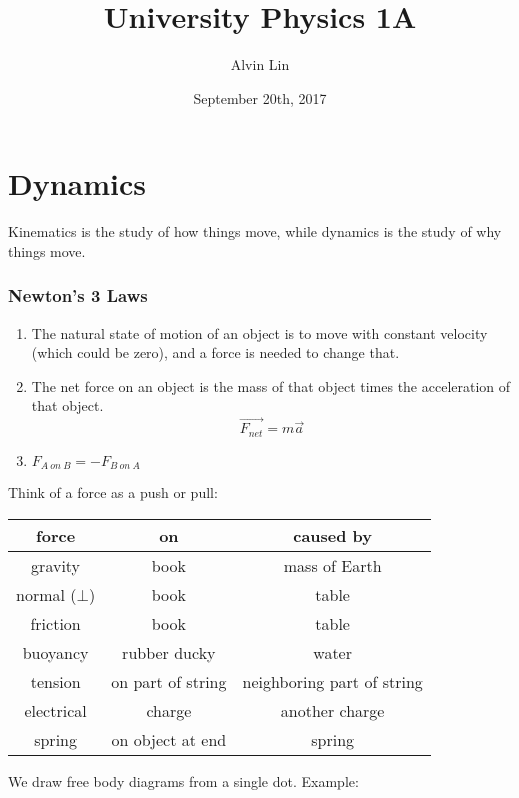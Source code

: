 \documentclass[letterpaper, 12pt]{math}
\title{University Physics 1A}
\author{Alvin Lin}
\date{September 20th, 2017}
\begin{document}
\maketitle

\section*{Dynamics}
Kinematics is the study of how things move, while dynamics is the study of why
things move.

\subsubsection*{Newton's 3 Laws}
\begin{enumerate}
  \item The natural state of motion of an object is to move with
    constant velocity (which could be zero), and a force is needed to
    change that.
  \item The net force on an object is the mass of that object times the
    acceleration of that object.
    \[ \overrightarrow{F_{net}} = m\vec{a} \]
  \item \( F_{A\ on\ B} = -F_{B\ on\ A} \)
\end{enumerate}
Think of a force as a push or pull:
\begin{center}
  \begin{tabular}{|c|c|c|}
    \hline
    \textbf{force} & \textbf{on} & \textbf{caused by} \\ \hline
    gravity & book & mass of Earth \\ \hline
    normal (\( \bot \)) & book & table \\ \hline
    friction & book & table \\ \hline
    buoyancy & rubber ducky & water \\ \hline
    tension & on part of string & neighboring part of string \\ \hline
    electrical & charge & another charge \\ \hline
    spring & on object at end & spring \\ \hline
  \end{tabular}
\end{center}

We draw free body diagrams from a single dot. Example:
\begin{center}
\end{center}
\end{document}
